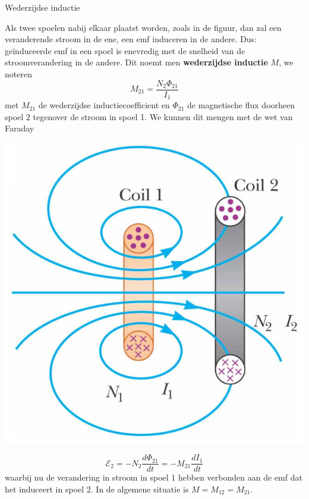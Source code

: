 \begin{theo}{Wederzijdse inductie}
    \begin{minipage}{.78\textwidth}
        Als twee spoelen nabij elkaar plaatst worden, zoals in de figuur, dan zal een veranderende stroom in de ene, 
        een emf induceren in de andere. Dus: geïnduceerde emf in een spoel is enevredig met de snelheid van de stroomverandering
        in de andere. Dit noemt men \textbf{wederzijdse inductie} $M$, we noteren
        \begin{equation*}
            M_{21} = \dfrac{N_{2}\Phi_{21}}{I_{1}} 
        \end{equation*}
        met $M_{21}$ de wederzijdse inductiecoefficient en $\Phi_{21}$ de magnetische flux doorheen spoel 2 tegenover de stroom in spoel 1.
        We kunnen dit mengen met de wet van Faraday
    \end{minipage}
    \begin{minipage}{.18\textwidth}
        \includegraphics[scale=0.3]{Images/Magnetisme/WederzijdseInductie}
    \end{minipage}
    \begin{equation*}
        \mathcal{E}_{2} = - N_{2}\dfrac{d\Phi_{21}}{dt} = - M_{21}\dfrac{dI_{1}}{dt}
    \end{equation*}
    waarbij nu de verandering in stroom in spoel 1 hebben verbonden aan de emf dat het induceert in spoel 2.  In de algemene situatie is 
    $M = M_{12} = M_{21}$.
\end{theo}


